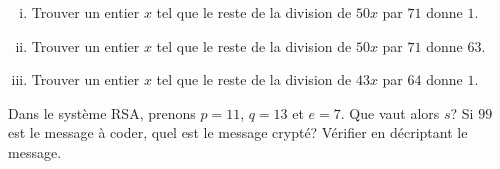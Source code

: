 \documentclass[11pt, a4paper]{article}
\begin{document}
\vspace*{0.8cm}
\begin{exo} 
\begin{enumerate}[(i)]
\item Trouver un entier $x$ tel que le reste de la division de $50x$ par $71$ donne $1$.
\item Trouver un entier $x$ tel que le reste de la division de $50x$ par $71$ donne $63$.
\item Trouver un entier $x$ tel que le reste de la division de $43x$ par $64$ donne $1$.
\end{enumerate}
\end{exo}

\vspace*{0.8cm}
\begin{exo}
Dans le syst\`eme RSA, prenons $p=11$, $q=13$ et $e=7$. Que vaut alors $s$? Si $99$ est le message \`a coder, quel est le message crypt\'e? V\'erifier en d\'ecriptant le message.
\end{exo}

\thispagestyle{empty}
\end{document}
